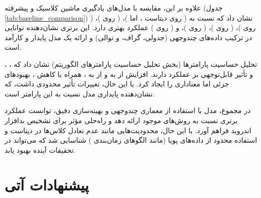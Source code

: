 علاوه بر این، مقایسه با مدل‌های یادگیری ماشین کلاسیک و پیشرفته (جدول \ref{tab:baseline_comparison}) نشان داد که  نسبت به  (  روی دیتاست ، اما  )،  (  روی )،  (  روی )،  (  روی )،  (  روی )، و  (  روی ) عملکرد بهتری دارد. این برتری نشان‌دهنده توانایی  در ترکیب داده‌های چندوجهی (جدولی، گراف، و توالی) و ارائه یک مدل پایدار و کارآمد است.

تحلیل حساسیت پارامترها (بخش تحلیل حساسیت پارامترهای الگوریتم) نشان داد که ، ، و  تأثیر قابل‌توجهی بر عملکرد دارند. افزایش  از  به  و  از  به ، همراه با کاهش ، بهبودهای جزئی اما معناداری را ایجاد کرد. با این حال، تغییرات  تأثیر محدودی داشت، که نشان‌دهنده پایداری مدل نسبت به این پارامتر است.

در مجموع، مدل  با استفاده از معماری چندوجهی و بهینه‌سازی دقیق، توانست عملکرد برتری نسبت به روش‌های موجود ارائه دهد و راه‌حلی مؤثر برای تشخیص بدافزار اندروید فراهم آورد. با این حال، محدودیت‌هایی مانند عدم تعادل کلاس‌ها در دیتاست  و استفاده محدود از داده‌های پویا (مانند الگوهای زمان‌بندی ) شناسایی شد که می‌تواند در تحقیقات آینده بهبود یابد.

\section{پیشنهادات آتی}
